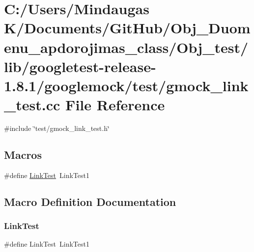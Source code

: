 \hypertarget{_obj__test_2lib_2googletest-release-1_88_81_2googlemock_2test_2gmock__link__test_8cc}{}\section{C\+:/\+Users/\+Mindaugas K/\+Documents/\+Git\+Hub/\+Obj\+\_\+\+Duomenu\+\_\+apdorojimas\+\_\+class/\+Obj\+\_\+test/lib/googletest-\/release-\/1.8.1/googlemock/test/gmock\+\_\+link\+\_\+test.cc File Reference}
\label{_obj__test_2lib_2googletest-release-1_88_81_2googlemock_2test_2gmock__link__test_8cc}
{\ttfamily \#include \char`\"{}test/gmock\+\_\+link\+\_\+test.\+h\char`\"{}}\newline
\subsection*{Macros}
\begin{DoxyCompactItemize}
\item 
\#define \mbox{\hyperlink{_obj__test_2lib_2googletest-release-1_88_81_2googlemock_2test_2gmock__link__test_8cc_afb3d3e7fd53242710a55460595d750bb}{Link\+Test}}~Link\+Test1
\end{DoxyCompactItemize}


\subsection{Macro Definition Documentation}
\mbox{\label{_obj__test_2lib_2googletest-release-1_88_81_2googlemock_2test_2gmock__link__test_8cc_afb3d3e7fd53242710a55460595d750bb}} 
\subsubsection{\texorpdfstring{LinkTest}{LinkTest}}
{\footnotesize\ttfamily \#define Link\+Test~Link\+Test1}

